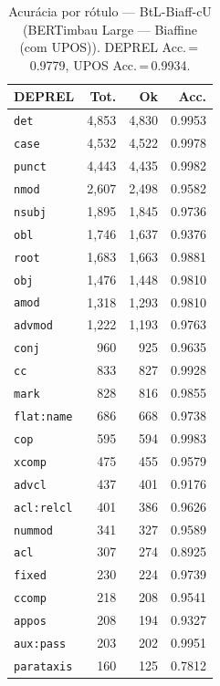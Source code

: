 \begin{table}[ht]
\centering
\caption{Acurácia por rótulo --- BtL-Biaff-cU (BERTimbau Large — Biaffine (com UPOS)). DEPREL Acc.\,=\,0.9779, UPOS Acc.\,=\,0.9934.}
\label{tab:acc-predict-test-df-bertimbau-large-biaffine}
\begin{minipage}[t]{0.55\linewidth}
\centering\scriptsize
\begin{tabular}{lrrr}
\toprule
\textbf{DEPREL} & \textbf{Tot.} & \textbf{Ok} & \textbf{Acc.} \\
\midrule
\texttt{det} & 4,853 & 4,830 & 0.9953 \\
\texttt{case} & 4,532 & 4,522 & 0.9978 \\
\texttt{punct} & 4,443 & 4,435 & 0.9982 \\
\texttt{nmod} & 2,607 & 2,498 & 0.9582 \\
\texttt{nsubj} & 1,895 & 1,845 & 0.9736 \\
\texttt{obl} & 1,746 & 1,637 & 0.9376 \\
\texttt{root} & 1,683 & 1,663 & 0.9881 \\
\texttt{obj} & 1,476 & 1,448 & 0.9810 \\
\texttt{amod} & 1,318 & 1,293 & 0.9810 \\
\texttt{advmod} & 1,222 & 1,193 & 0.9763 \\
\texttt{conj} & 960 & 925 & 0.9635 \\
\texttt{cc} & 833 & 827 & 0.9928 \\
\texttt{mark} & 828 & 816 & 0.9855 \\
\texttt{flat\!:\!name} & 686 & 668 & 0.9738 \\
\texttt{cop} & 595 & 594 & 0.9983 \\
\texttt{xcomp} & 475 & 455 & 0.9579 \\
\texttt{advcl} & 437 & 401 & 0.9176 \\
\texttt{acl\!:\!relcl} & 401 & 386 & 0.9626 \\
\texttt{nummod} & 341 & 327 & 0.9589 \\
\texttt{acl} & 307 & 274 & 0.8925 \\
\texttt{fixed} & 230 & 224 & 0.9739 \\
\texttt{ccomp} & 218 & 208 & 0.9541 \\
\texttt{appos} & 208 & 194 & 0.9327 \\
\texttt{aux\!:\!pass} & 203 & 202 & 0.9951 \\
\texttt{parataxis} & 160 & 125 & 0.7812 \\

\end{tabular}
\end{minipage}
\end{table}
